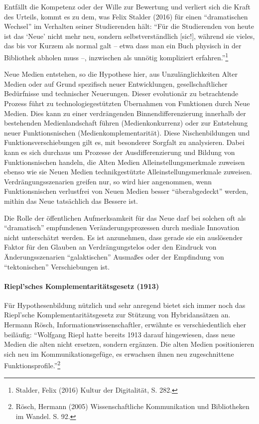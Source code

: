 \documentclass[a4paper,
fontsize=11pt,
oneside,
numbers=noperiodatend,
parskip=half-,
bibliography=totoc,
final
]{scrartcl}
\begin{document}
Entfällt die Kompetenz oder der Wille zur Bewertung und verliert sich
die Kraft des Urteils, kommt es zu dem, was Felix Stalder (2016) für
einen \enquote{dramatischen Wechsel} im Verhalten seiner Studierenden
hält: \enquote{Für die Studierenden von heute ist das \enquote{Neue}
nicht mehr neu, sondern selbstverständlich {[}sic!{]}, während sie
vieles, das bis vor Kurzem als normal galt -- etwa dass man ein Buch
physisch in der Bibliothek abholen muss --, inzwischen als unnötig
kompliziert erfahren.}\footnote{Stalder, Felix (2016) Kultur der
  Digitalität, S. 282.}

Neue Medien entstehen, so die Hypothese hier, aus Unzulänglichkeiten
Alter Medien oder auf Grund spezifisch neuer Entwicklungen,
gesellschaftlicher Bedürfnisse und technischer Neuerungen. Dieser
evolutionär zu betrachtende Prozess führt zu technologiegestützten
Übernahmen von Funktionen durch Neue Medien. Dies kann zu einer
verdrängenden Binnendifferenzierung innerhalb der bestehenden
Medienlandschaft führen (Medienkonkurrenz) oder zur Entstehung neuer
Funktionsnischen (Medienkomplementarität). Diese Nischenbildungen und
Funktionsverschiebungen gilt es, mit besonderer Sorgfalt zu analysieren.
Dabei kann es sich durchaus um Prozesse der Ausdifferenzierung und
Bildung von Funktionsnischen handeln, die Alten Medien
Alleinstellungsmerkmale zuweisen ebenso wie sie Neuen Medien
technikgestützte Alleinstellungsmerkmale zuweisen. Verdrängungsszenarien
greifen nur, so wird hier angenommen, wenn Funktionsnischen verlustfrei
von Neuen Medien besser \enquote{überabgedeckt} werden, mithin das Neue
tatsächlich das Bessere ist.

Die Rolle der öffentlichen Aufmerksamkeit für das Neue darf bei solchen
oft als \enquote{dramatisch} empfundenen Veränderungsprozessen durch
mediale Innovation nicht unterschätzt werden. Es ist anzunehmen, dass
gerade sie ein auslösender Faktor für den Glauben an Verdrängungstelos
oder den Eindruck von Änderungsszenarien \enquote{galaktischen} Ausmaßes
oder der Empfindung von \enquote{tektonischen} Verschiebungen ist.

\paragraph{Riepl'sches Komplementaritätsgesetz
(1913)}\label{rieplsches-komplementarituxe4tsgesetz-1913}

Für Hypothesenbildung nützlich und sehr anregend bietet sich immer noch
das Riepl'sche Komplementaritätsgesetz zur Stützung von Hybridansätzen
an. Hermann Rösch, Informationswissenschaftler, erwähnte es
verschiedentlich eher beiläufig: \enquote{Wolfgang Riepl hatte bereits
1913 darauf hingewiesen, dass neue Medien die alten nicht ersetzen,
sondern ergänzen. Die alten Medien positionieren sich neu im
Kommunikationsgefüge, es erwachsen ihnen neu zugeschnittene
Funktionsprofile.}\footnote{Rösch, Hermann (2005) Wissenschaftliche
  Kommunikation und Bibliotheken im Wandel. S. 92.}
\end{document}
